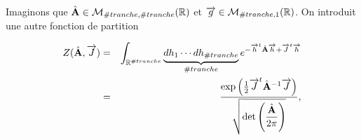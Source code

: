 Imaginons que $\hat{\mathbf{A}} \in \mathcal{M}_{\#tranche,\#tranche}(\mathbb{R})$ et $\mathbf{\overrightarrow{g}} \in  \mathcal{M}_{\#tranche,1}(\mathbb{R})$. On introduit une autre fonction de partition 


\begin{eqnarray}
	Z(\hat{\mathbf{A}} , \mathbf{\overrightarrow{J}})	 & = & \int_{\mathbb{R}^{\#tranche}} \underbrace{dh_1 \cdots dh_{\#tranche}}_{\#tranche} 	e^{-\mathbf{\overrightarrow{h}}^t\hat{\mathbf{A}} \mathbf{\overrightarrow{h}} + \mathbf{\overrightarrow{J}}^t \mathbf{\overrightarrow{h}} } \\
	& = & \frac{ \exp\left ( \frac{1}{2} \mathbf{\overrightarrow{J}}^t \hat{\mathbf{A}}^{-1} \mathbf{\overrightarrow{J}} \right)}{\sqrt{\det \left ( \displaystyle \frac{\hat{\mathbf{A}}}{2\pi}\right ) }}, 
\end{eqnarray}


